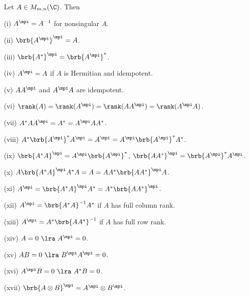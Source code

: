 \begin{proposition}\label{pro:mp_inverse_basic_properties}
Let $A\in M_{m,n}(\C)$. Then
\ben
\item [(i)] $A^\mpi = A^{-1}$ for nonsingular $A$.
\item [(ii)] $\brb{A^\mpi}^\mpi = A$.
\item [(iii)] $\brb{A^*}^\mpi = \brb{A^\mpi}^*$.
\item [(iv)] $A^\mpi =A$ if $A$ is Hermitian and idempotent.
\item [(v)] $AA^\mpi$ and $A^\mpi A$ are idempotent.
\item [(vi)] $\rank(A) = \rank(A^\mpi) = \rank(AA^\mpi) = \rank(A^\mpi A)$.
\item [(vii)] $A^*AA^\mpi = A^* = A^\mpi AA^*$.
\item [(viii)] $A^*\brb{A^\mpi}^* A^\mpi = A^\mpi = A^\mpi \brb{A^\mpi}^* A^*$.
\item [(ix)] $\brb{A^*A}^\mpi = A^\mpi \brb{A^\mpi}^*$, $\brb{AA^*}^\mpi = \brb{A^\mpi}^*A^\mpi $.
\item [(x)] $A\brb{A^*A}^\mpi A^*A = A = AA^*\brb{AA^*}^\mpi A$.
\item [(xi)] $A^\mpi = \brb{A^*A}^\mpi A^* = A^* \brb{AA^*}^\mpi$.
\item [(xii)] $A^\mpi = \brb{A^*A}^{-1} A^*$ if $A$ has full column rank.
\item [(xiii)] $A^\mpi = A^* \brb{AA^*}^{-1}$ if $A$ has full row rank.
\item [(xiv)] $A= 0 \ \lra \ A^\mpi = 0$.
\item [(xv)] $AB = 0 \ \lra \ B^\mpi A^\mpi = 0$.
\item [(xvi)] $A^\mpi B = 0 \ \lra\ A^* B = 0$.
\item [(xvii)] $\brb{A\otimes B}^\mpi = A^\mpi \otimes B^\mpi$.
\een
\end{proposition}

